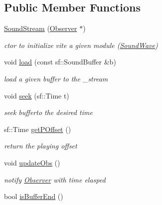 \subsection*{Public Member Functions}
\begin{DoxyCompactItemize}
\item 
\hyperlink{classSoundStream_a657d7c346a127b40babbcee278a553e3}{Sound\+Stream} (\hyperlink{classObserver}{Observer} $\ast$)\hypertarget{classSoundStream_a657d7c346a127b40babbcee278a553e3}{}\label{classSoundStream_a657d7c346a127b40babbcee278a553e3}

\begin{DoxyCompactList}\small\item\em ctor to initialize vite a given module (\hyperlink{classSoundWave}{Sound\+Wave}) \end{DoxyCompactList}\item 
void \hyperlink{classSoundStream_a6a7e2f763ae6e8def2abe4944b32e1ee}{load} (const sf\+::\+Sound\+Buffer \&b)
\begin{DoxyCompactList}\small\item\em load a given buffer to the \+\_\+stream \end{DoxyCompactList}\item 
void \hyperlink{classSoundStream_ad6d518aee983bc841767e884645bac8a}{seek} (sf\+::\+Time t)
\begin{DoxyCompactList}\small\item\em seek bufferto the desired time \end{DoxyCompactList}\item 
sf\+::\+Time \hyperlink{classSoundStream_ad3db0e2917077836eda35aec5ce152bc}{get\+P\+Offset} ()
\begin{DoxyCompactList}\small\item\em return the playing offset \end{DoxyCompactList}\item 
void \hyperlink{classSoundStream_a9776d4bdacd2d310290d0107ae0817f7}{update\+Obs} ()\hypertarget{classSoundStream_a9776d4bdacd2d310290d0107ae0817f7}{}\label{classSoundStream_a9776d4bdacd2d310290d0107ae0817f7}

\begin{DoxyCompactList}\small\item\em notify \hyperlink{classObserver}{Observer} with time elasped \end{DoxyCompactList}\item 
bool \hyperlink{classSoundStream_a73e8f2450e0e626ea99d70715b586edc}{is\+Buffer\+End} ()\hypertarget{classSoundStream_a73e8f2450e0e626ea99d70715b586edc}{}\label{classSoundStream_a73e8f2450e0e626ea99d70715b586edc}


\end{DoxyCompactItemize}
